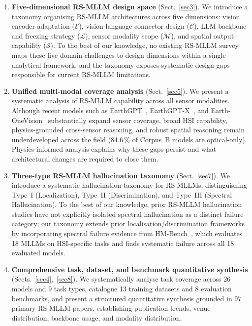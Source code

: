 \begin{enumerate}

\item \textbf{Five-dimensional RS-MLLM design space} (Sect.~\ref{sec3}). We
introduce a taxonomy organising RS-MLLM architectures across five dimensions:
vision encoder adaptation ($\mathcal{E}$), vision-language connector design
($\mathcal{C}$), LLM backbone and freezing strategy ($\mathcal{L}$), sensor modality
scope ($\mathcal{M}$), and spatial output capability ($\mathcal{S}$). To the best of
our knowledge, no existing RS-MLLM survey maps these five domain challenges to
design dimensions within a single analytical framework, and the taxonomy exposes
systematic design gaps responsible for current RS-MLLM limitations.

\item \textbf{Unified multi-modal coverage analysis} (Sect.~\ref{sec5}). We present
a systematic analysis of RS-MLLM capability across all sensor modalities.
Although recent models such as EarthGPT~\cite{earthgpt2025},
EarthGPT-X~\cite{earthgptx2026}, and Earth-OneVision~\cite{earthonevision2026}
substantially expand sensor coverage, broad HSI capability, physics-grounded
cross-sensor reasoning, and robust spatial reasoning remain underdeveloped
across the field (84.6\,\% of Corpus~B models are optical-only).
Physics-informed analysis explains why these gaps persist and what architectural
changes are required to close them.

\item \textbf{Three-type RS-MLLM hallucination taxonomy} (Sect.~\ref{sec7}). We
introduce a systematic hallucination taxonomy for RS-MLLMs, distinguishing
Type~I (Localization), Type~II (Discrimination), and Type~III (Spectral Hallucination).
To the best of our knowledge, prior RS-MLLM hallucination studies have not
explicitly isolated spectral hallucination as a distinct failure category;
our taxonomy extends prior localisation/discrimination frameworks by
incorporating spectral failure evidence from HM-Bench~\cite{hmbench2026},
which evaluates 18 MLLMs on HSI-specific tasks and finds systematic failure
across all 18 evaluated models.

\item \textbf{Comprehensive task, dataset, and benchmark quantitative synthesis}
(Sects.~\ref{sec4},~\ref{sec8}). We systematically analyse task coverage across 26
models and 9 task types, catalogue 13 training datasets and 8 evaluation benchmarks,
and present a structured quantitative synthesis grounded in 97 primary
RS-MLLM papers, establishing publication trends, venue distribution,
backbone usage, and modality distribution.

\end{enumerate}

